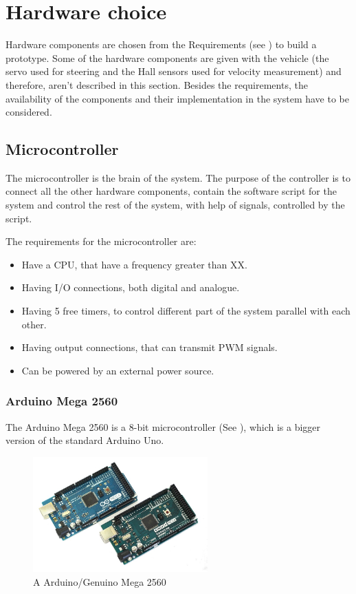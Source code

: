 \section{Hardware choice} \label{Hardwarechoice}
Hardware components are chosen from the Requirements (see ) to build a prototype. 
Some of the hardware components are given with the vehicle (the servo used for steering and the Hall sensors used for velocity measurement) and therefore, aren't described in this section. 
Besides the requirements, the availability of the components and their implementation in the system have to be considered. 


\subsection{Microcontroller}
The microcontroller is the brain of the system. The purpose of the controller is to connect all the other hardware components, contain the software script for the system and control the rest of the system, with help of signals, controlled by the script.

The requirements for the microcontroller are:
\begin{itemize}
\item Have a CPU, that have a frequency greater than XX. 
\item Having I/O connections, both digital and analogue.
\item Having 5 free timers, to control different part of the system parallel with each other.
\item Having output connections, that can transmit PWM signals.
\item Can be powered by an external power source.
\end{itemize} 

\subsubsection{Arduino Mega 2560}
The Arduino Mega 2560 is a 8-bit microcontroller (See ), which is a bigger version of the standard Arduino Uno. 

\begin{figure}[H]
	\centering
	\includegraphics[width=0.60\textwidth]{figures/ArdGenMega}
		\caption{A Arduino/Genuino Mega 2560} 
	\label{ArdGenMega}
\end{figure}

